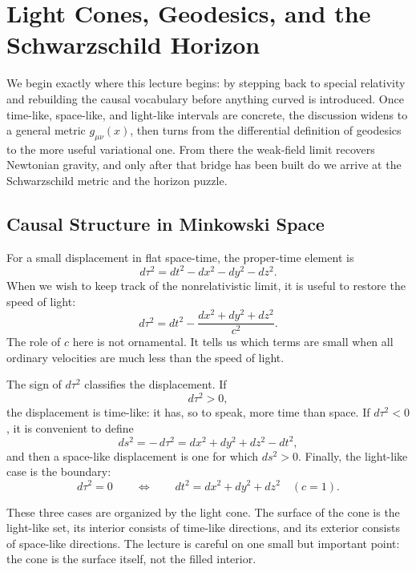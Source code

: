 \chapter{Light Cones, Geodesics, and the Schwarzschild Horizon}

We begin exactly where this lecture begins: by stepping back to special relativity and rebuilding the causal vocabulary before anything curved is introduced. Once time-like, space-like, and light-like intervals are concrete, the discussion widens to a general metric \(g_{\mu\nu}(x)\), then turns from the differential definition of geodesics to the more useful variational one. From there the weak-field limit recovers Newtonian gravity, and only after that bridge has been built do we arrive at the Schwarzschild metric and the horizon puzzle.

\section{Causal Structure in Minkowski Space}

For a small displacement in flat space-time, the proper-time element is
\begin{equation}
d\tau^2 = dt^2 - dx^2 - dy^2 - dz^2.
\end{equation}
When we wish to keep track of the nonrelativistic limit, it is useful to restore the speed of light:
\begin{equation}
d\tau^2 = dt^2 - \frac{dx^2+dy^2+dz^2}{c^2}.
\end{equation}
The role of \(c\) here is not ornamental. It tells us which terms are small when all ordinary velocities are much less than the speed of light.

The sign of \(d\tau^2\) classifies the displacement. If
\begin{equation}
d\tau^2 > 0,
\end{equation}
the displacement is time-like: it has, so to speak, more time than space. If \(d\tau^2<0\), it is convenient to define
\begin{equation}
ds^2 = -\,d\tau^2 = dx^2+dy^2+dz^2-dt^2,
\end{equation}
and then a space-like displacement is one for which \(ds^2>0\). Finally, the light-like case is the boundary:
\begin{equation}
d\tau^2=0
\qquad\Longleftrightarrow\qquad
dt^2 = dx^2+dy^2+dz^2
\quad (c=1).
\end{equation}

These three cases are organized by the light cone. The surface of the cone is the light-like set, its interior consists of time-like directions, and its exterior consists of space-like directions. The lecture is careful on one small but important point: the cone is the surface itself, not the filled interior.

